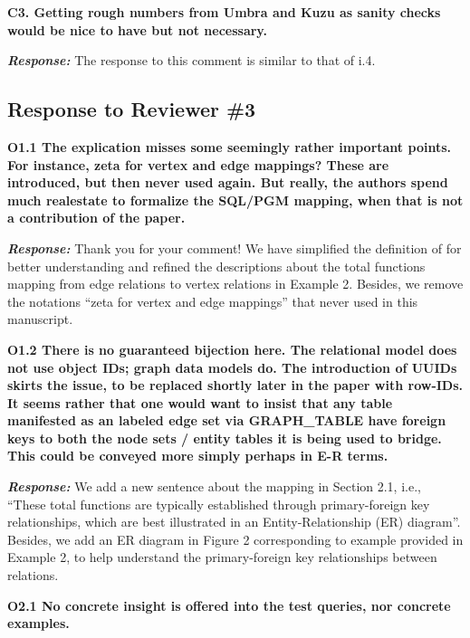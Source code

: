 \textbf{
C3. Getting rough numbers from Umbra and Kuzu as sanity checks would be nice to have but not necessary.}

\textbf{\textit{Response: }}
The response to this comment is similar to that of i.4.


\subsection{Response to Reviewer \#3}

\textbf{
O1.1 The explication misses some seemingly rather important points.
For instance, zeta for vertex and edge mappings? These are introduced, but then never used again. But really, the authors spend much realestate to formalize the SQL/PGM mapping, when that is not a contribution of the paper.}

\textbf{\textit{Response: }}
Thank you for your comment! We have simplified the definition of \rgmapping for better understanding and refined the descriptions about the total functions mapping from edge relations to vertex relations in Example 2.
Besides, we remove the notations ``zeta for vertex and edge mappings'' that never used in this manuscript.


\textbf{
O1.2 There is no guaranteed bijection here. The relational model does not use object IDs; graph data models do. The introduction of UUIDs skirts the issue, to be replaced shortly later in the paper with row-IDs. It seems rather that one would want to insist that any table manifested as an labeled edge set via GRAPH\_TABLE have foreign keys to both the node sets / entity tables it is being used to bridge. This could be conveyed more simply perhaps in E-R terms.}

\textbf{\textit{Response: }}
We add a new sentence about the mapping in Section 2.1, i.e., ``These total functions are typically established through primary-foreign key relationships, which are best illustrated in an Entity-Relationship (ER) diagram''.
Besides, we add an ER diagram in Figure 2 corresponding to example provided in Example 2, to help understand the primary-foreign key relationships between relations. 


\textbf{O2.1 No concrete insight is offered into the test queries, nor concrete examples. }

